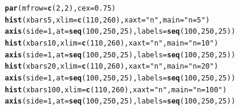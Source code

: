 \documentclass[fleqn]{article}\usepackage[]{graphicx}\usepackage[]{color}
\makeatletter
\newcommand{\hlnum}[1]{\textcolor[rgb]{0.686,0.059,0.569}{#1}}%
\newcommand{\hlstr}[1]{\textcolor[rgb]{0.192,0.494,0.8}{#1}}%
\newcommand{\hlstd}[1]{\textcolor[rgb]{0.345,0.345,0.345}{#1}}%
\newcommand{\hlkwc}[1]{\textcolor[rgb]{0.333,0.667,0.333}{#1}}%
\newcommand{\hlkwd}[1]{\textcolor[rgb]{0.737,0.353,0.396}{\textbf{#1}}}%
\newenvironment{kframe}{%
 \def\at@end@of@kframe{}%
 \ifinner\ifhmode%
  \def\at@end@of@kframe{\end{minipage}}%
  \begin{minipage}{\columnwidth}%
 \fi\fi%
 \def\FrameCommand##1{\hskip\@totalleftmargin \hskip-\fboxsep
 \colorbox{shadecolor}{##1}\hskip-\fboxsep
     \hskip-\linewidth \hskip-\@totalleftmargin \hskip\columnwidth}%
 \MakeFramed {\advance\hsize-\width
   \@totalleftmargin\z@ \linewidth\hsize
   \@setminipage}}%
 {\par\unskip\endMakeFramed%
 \at@end@of@kframe}
\newenvironment{knitrout}{}{} %
\makeatother
\begin{document}
\begin{knitrout}
\begin{kframe}
\begin{alltt}
\hlkwd{par}\hlstd{(}\hlkwc{mfrow}\hlstd{=}\hlkwd{c}\hlstd{(}\hlnum{2}\hlstd{,}\hlnum{2}\hlstd{),} \hlkwc{cex}\hlstd{=}\hlnum{0.75}\hlstd{)}
\hlkwd{hist}\hlstd{(xbars5,} \hlkwc{xlim}\hlstd{=}\hlkwd{c}\hlstd{(}\hlnum{110}\hlstd{,} \hlnum{260}\hlstd{),} \hlkwc{xaxt}\hlstd{=}\hlstr{"n"}\hlstd{,} \hlkwc{main} \hlstd{=} \hlstr{"n=5"}\hlstd{)}
\hlkwd{axis}\hlstd{(}\hlkwc{side}\hlstd{=}\hlnum{1}\hlstd{,} \hlkwc{at}\hlstd{=}\hlkwd{seq}\hlstd{(}\hlnum{100}\hlstd{,} \hlnum{250}\hlstd{,} \hlnum{25}\hlstd{),} \hlkwc{labels}\hlstd{=}\hlkwd{seq}\hlstd{(}\hlnum{100}\hlstd{,} \hlnum{250}\hlstd{,} \hlnum{25}\hlstd{))}
\hlkwd{hist}\hlstd{(xbars10,} \hlkwc{xlim}\hlstd{=}\hlkwd{c}\hlstd{(}\hlnum{110}\hlstd{,} \hlnum{260}\hlstd{),} \hlkwc{xaxt}\hlstd{=}\hlstr{"n"}\hlstd{,} \hlkwc{main} \hlstd{=} \hlstr{"n=10"}\hlstd{)}
\hlkwd{axis}\hlstd{(}\hlkwc{side}\hlstd{=}\hlnum{1}\hlstd{,} \hlkwc{at}\hlstd{=}\hlkwd{seq}\hlstd{(}\hlnum{100}\hlstd{,} \hlnum{250}\hlstd{,} \hlnum{25}\hlstd{),} \hlkwc{labels}\hlstd{=}\hlkwd{seq}\hlstd{(}\hlnum{100}\hlstd{,} \hlnum{250}\hlstd{,} \hlnum{25}\hlstd{))}
\hlkwd{hist}\hlstd{(xbars20,} \hlkwc{xlim}\hlstd{=}\hlkwd{c}\hlstd{(}\hlnum{110}\hlstd{,} \hlnum{260}\hlstd{),} \hlkwc{xaxt}\hlstd{=}\hlstr{"n"}\hlstd{,} \hlkwc{main} \hlstd{=} \hlstr{"n=20"}\hlstd{)}
\hlkwd{axis}\hlstd{(}\hlkwc{side}\hlstd{=}\hlnum{1}\hlstd{,} \hlkwc{at}\hlstd{=}\hlkwd{seq}\hlstd{(}\hlnum{100}\hlstd{,} \hlnum{250}\hlstd{,} \hlnum{25}\hlstd{),} \hlkwc{labels}\hlstd{=}\hlkwd{seq}\hlstd{(}\hlnum{100}\hlstd{,} \hlnum{250}\hlstd{,} \hlnum{25}\hlstd{))}
\hlkwd{hist}\hlstd{(xbars100,} \hlkwc{xlim}\hlstd{=}\hlkwd{c}\hlstd{(}\hlnum{110}\hlstd{,} \hlnum{260}\hlstd{),} \hlkwc{xaxt}\hlstd{=}\hlstr{"n"}\hlstd{,} \hlkwc{main} \hlstd{=} \hlstr{"n=100"}\hlstd{)}
\hlkwd{axis}\hlstd{(}\hlkwc{side}\hlstd{=}\hlnum{1}\hlstd{,} \hlkwc{at}\hlstd{=}\hlkwd{seq}\hlstd{(}\hlnum{100}\hlstd{,} \hlnum{250}\hlstd{,} \hlnum{25}\hlstd{),} \hlkwc{labels}\hlstd{=}\hlkwd{seq}\hlstd{(}\hlnum{100}\hlstd{,} \hlnum{250}\hlstd{,} \hlnum{25}\hlstd{))}
\end{alltt}
\end{kframe}

\end{knitrout}
\end{document}
